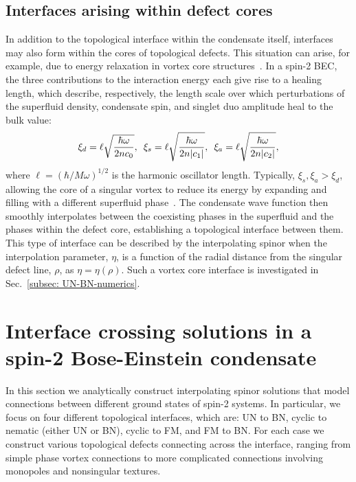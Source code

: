 \subsection{Interfaces arising within defect cores}
In addition to the topological interface within the condensate itself,
interfaces may also form within the cores of topological defects.
This situation can arise, for example, due to energy relaxation in vortex core
structures~\cite{Ruostekoski2003,Lovegrove2012,Lovegrove2016,Borgh2016,
    Borgh2016a, Weiss2019,Xiao2021,Xiao2022}.
In a spin-2 BEC, the three contributions to the interaction energy each give
rise to a healing length, which describe, respectively, the length scale over
which perturbations of the superfluid density, condensate spin, and singlet duo
amplitude heal to the bulk value:
\begin{equation}
    \xi_d=\ell \sqrt{\frac{\hbar\omega}{2nc_0}},
    \enskip \xi_s=\ell \sqrt{\frac{\hbar\omega}{2n|c_1|}},
    \enskip \xi_a=\ell \sqrt{\frac{\hbar\omega}{2n|c_2|}},
    \label{eq: spin-2-healing-lengths}
\end{equation}
where \(\ell = {(\hbar/M\omega)}^{1/2}\) is the harmonic oscillator length.
Typically, \(\xi_s,\xi_a > \xi_d\), allowing the core of a singular vortex
to reduce its energy by expanding and filling with a different superfluid
phase~\cite{Ruostekoski2003}.
The condensate wave function then smoothly interpolates between the coexisting
phases in the superfluid and the phases within the defect core, establishing a
topological interface between them.
This type of interface can be described by the interpolating spinor when the
interpolation parameter, \(\eta\), is a function of the radial distance from the
singular defect line, \(\rho\), as \(\eta=\eta(\rho)\).
Such a vortex core interface is investigated in
Sec.~\ref{subsec: UN-BN-numerics}.

\section{Interface crossing solutions in a spin-2 Bose-Einstein condensate}
In this section we analytically construct interpolating spinor solutions that
model connections between different ground states of spin-2 systems.
In particular, we focus on four different topological interfaces, which are:
UN to BN, cyclic to nematic (either UN or BN), cyclic to FM, and
FM to BN\@.
For each case we construct various topological defects connecting across the
interface, ranging from simple phase vortex connections to more complicated
connections involving monopoles and nonsingular textures.

